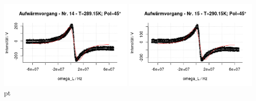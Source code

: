 \documentclass[12pt]{article}
\begin{document}
\begin{minipage}[h!]{\textwidth}
{		\includegraphics[width=0.49\textwidth]{figures/warm45-14.png}\vskip -10pt}	\includegraphics[width=0.49\textwidth]{figures/warm45-15.png} pt
\end{minipage}
\end{document}
